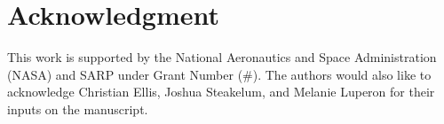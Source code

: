 \documentclass[conference]{IEEEtran}
\begin{document}
\section*{Acknowledgment}\label{sec:Ack}
This work is supported by the National Aeronautics and Space Administration (NASA) and SARP under Grant Number (\#). The authors would also like to acknowledge Christian Ellis, Joshua Steakelum, and Melanie Luperon for their inputs on the manuscript.




\end{document}
